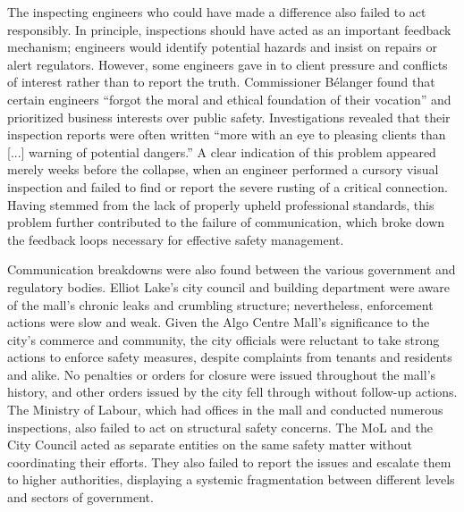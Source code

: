 \documentclass[12pt]{article}
\begin{document}
The inspecting engineers who could have made a difference also failed to act responsibly. In principle, inspections should have acted as an important feedback mechanism; engineers would identify potential hazards and insist on repairs or alert regulators. However, some engineers gave in to client pressure and conflicts of interest rather than to report the truth. Commissioner Bélanger found that certain engineers “forgot the moral and ethical foundation of their vocation” and prioritized business interests over public safety. Investigations revealed that their inspection reports were often written “more with an eye to pleasing clients than [...] warning of potential dangers.” A clear indication of this problem appeared merely weeks before the collapse, when an engineer performed a cursory visual inspection and failed to find or report the severe rusting of a critical connection. Having stemmed from the lack of properly upheld professional standards, this problem further contributed to the failure of communication, which broke down the feedback loops necessary for effective safety management.

Communication breakdowns were also found between the various government and regulatory bodies. Elliot Lake's city council and building department were aware of the mall's chronic leaks and crumbling structure; nevertheless, enforcement actions were slow and weak. Given the Algo Centre Mall's significance to the city's commerce and community, the city officials were reluctant to take strong actions to enforce safety measures, despite complaints from tenants and residents and alike. No penalties or orders for closure were issued throughout the mall's history, and other orders issued by the city fell through without follow-up actions. The Ministry of Labour, which had offices in the mall and conducted numerous inspections, also failed to act on structural safety concerns. The MoL and the City Council acted as separate entities on the same safety matter without coordinating their efforts. They also failed to report the issues and escalate them to higher authorities, displaying a systemic fragmentation between different levels and sectors of government.
\end{document}
